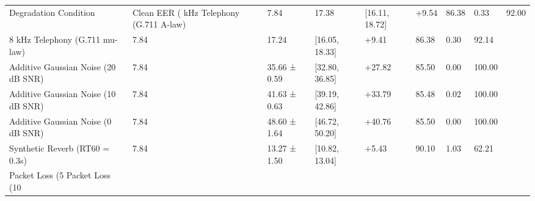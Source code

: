 \begin{tabular}{llllllll}
\toprule
Degradation Condition & Clean EER (%
 kHz Telephony (G.711 A-law) & 7.84 & 17.38 & [16.11, 18.72] & +9.54 & 86.38 & 0.33 & 92.00 \\
8 kHz Telephony (G.711 mu-law) & 7.84 & 17.24 & [16.05, 18.33] & +9.41 & 86.38 & 0.30 & 92.14 \\
Additive Gaussian Noise (20 dB SNR) & 7.84 & 35.66 ± 0.59 & [32.80, 36.85] & +27.82 & 85.50 & 0.00 & 100.00 \\
Additive Gaussian Noise (10 dB SNR) & 7.84 & 41.63 ± 0.63 & [39.19, 42.86] & +33.79 & 85.48 & 0.02 & 100.00 \\
Additive Gaussian Noise (0 dB SNR) & 7.84 & 48.60 ± 1.64 & [46.72, 50.20] & +40.76 & 85.50 & 0.00 & 100.00 \\
Synthetic Reverb (RT60 = 0.3s) & 7.84 & 13.27 ± 1.50 & [10.82, 13.04] & +5.43 & 90.10 & 1.03 & 62.21 \\
Packet Loss (5%
Packet Loss (10%
\bottomrule
\end{tabular}
